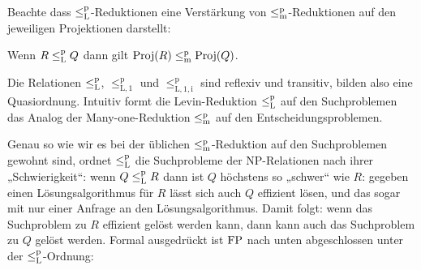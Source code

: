 Beachte dass $\leq_\mathrm{L}^\mathrm{p}$-Reduktionen eine Verstärkung von $\leq_\mathrm{m}^\mathrm{p}$-Reduktionen auf den jeweiligen Projektionen darstellt:
\begin{observation}
    Wenn $R\leq_\mathrm{L}^\mathrm{p} Q$ dann gilt $\operatorname{Proj}(R)\leq_\mathrm{m}^\mathrm{p} \operatorname{Proj}(Q)$.
\end{observation}


Die Relationen $\leq_\mathrm{L}^\mathrm{p}$, $\leq_\mathrm{L,1}^\mathrm p$ und $\leq_\mathrm{L,1,i}^\mathrm p$ sind reflexiv und transitiv, bilden also eine Quasiordnung.
Intuitiv formt die Levin-Reduktion $\leq_\mathrm{L}^\mathrm{p}$ auf den Suchproblemen das Analog der Many-one-Reduktion $\leq_\mathrm{m}^\mathrm{p}$ auf den Entscheidungsproblemen.

Genau so wie wir es bei der üblichen $\leq_\mathrm{m}^\mathrm{p}$-Reduktion auf den Suchproblemen gewohnt sind, ordnet $\leq_\mathrm{L}^\mathrm{p}$ die Suchprobleme der NP-Relationen nach ihrer „Schwierigkeit“: wenn $Q\leq_\mathrm{L}^\mathrm{p} R$ dann ist $Q$ höchstens so „schwer“ wie $R$: gegeben einen Lösungsalgorithmus für $R$ lässt sich auch $Q$ effizient lösen, und das sogar mit nur einer Anfrage an den Lösungsalgorithmus. Damit folgt: wenn das Suchproblem zu $R$ effizient gelöst werden kann, dann kann auch das Suchproblem zu $Q$ gelöst werden. 
Formal ausgedrückt ist $\mathrm{FP}$ nach unten abgeschlossen unter der $\leq_\mathrm{L}^\mathrm{p}$-Ordnung:
